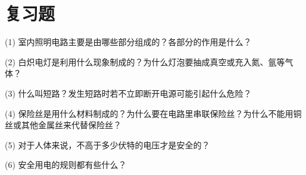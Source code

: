 \section*{复习题}

(1) 室内照明电路主要是由哪些部分组成的？各部分的作用是什么？

(2) 白炽电灯是利用什么现象制成的？为什么灯泡要抽成真空或充入氮、氩等气体？

(3) 什么叫短路？发生短路时若不立即断开电源可能引起什么危险？

(4) 保险丝是用什么材料制成的？为什么要在电路里串联保险丝？为什么不能用铜丝或其他金属丝来代替保险丝？

(5) 对于人体来说，不高于多少伏特的电压才是安全的？

(6) 安全用电的规则都有些什么？

